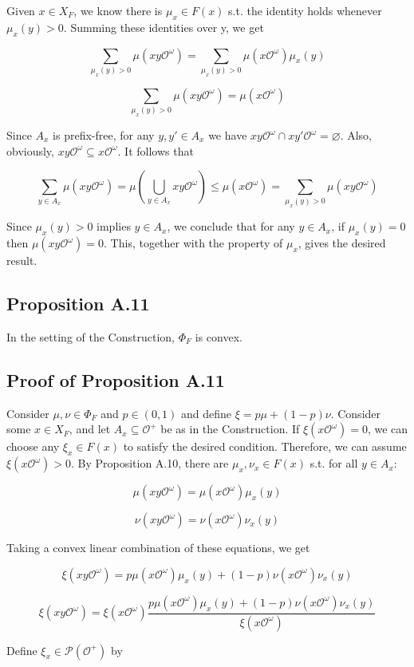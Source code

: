 \documentclass[a4paper]{article}
\newcommand{\Prob}{\mathcal{P}}
\newcommand{\Obs}{\mathcal{O}}
\newcommand{\ObsO}{\Obs^\omega}
\begin{document}
Given ${x \in X_F}$, we know there is ${\mu_x \in F(x)}$ s.t. the identity holds whenever ${\mu_x(y) > 0}$. Summing these identities over y, we get

$$\sum_{\mu_x(y) > 0} \mu(xy\ObsO) = \sum_{\mu_x(y) > 0} \mu(x\ObsO) \mu_x(y)$$

$$\sum_{\mu_x(y) > 0} \mu(xy\ObsO) = \mu(x\ObsO)$$

Since ${A_x}$ is prefix-free, for any ${y,y' \in A_x}$ we have ${xy\ObsO \cap xy'\ObsO = \varnothing}$. Also, obviously, ${xy\ObsO \subseteq x\ObsO}$. It follows that

$$\sum_{y \in A_x} \mu(xy\ObsO) = \mu(\bigcup_{y \in A_x} xy\ObsO) \leq \mu(x\ObsO) = \sum_{\mu_x(y) > 0} \mu(xy\ObsO)$$

Since ${\mu_x(y) > 0}$ implies ${y \in A_x}$, we conclude that for any ${y \in A_x}$, if ${\mu_x(y) = 0}$ then ${\mu(xy\ObsO)=0}$. This, together with the property of ${\mu_x}$, gives the desired result.

\subsection{Proposition A.11}

In the setting of the Construction, ${\Phi_F}$ is convex.

\subsection{Proof of Proposition A.11}

Consider ${\mu,\nu \in \Phi_F}$ and ${p \in (0,1)}$ and define ${\xi = p \mu + (1-p) \nu}$. Consider some ${x \in X_F}$, and let ${A_x \subseteq \Obs^+}$ be as in the Construction. If ${\xi(x\ObsO)=0}$, we can choose any ${\xi_x \in F(x)}$ to satisfy the desired condition. Therefore, we can assume ${\xi(x\ObsO) > 0}$. By Proposition A.10, there are ${\mu_x, \nu_x \in F(x)}$ s.t. for all ${y \in A_x}$:

$$\mu(xy\ObsO) = \mu(x\ObsO) \mu_x(y)$$

$$\nu(xy\ObsO) = \nu(x\ObsO) \nu_x(y)$$

Taking a convex linear combination of these equations, we get

$$\xi(xy\ObsO) = p \mu(x\ObsO) \mu_x(y) + (1-p) \nu(x\ObsO) \nu_x(y)$$

$$\xi(xy\ObsO) = \xi(x\ObsO) \frac{p \mu(x\ObsO) \mu_x(y) + (1-p) \nu(x\ObsO) \nu_x(y)}{\xi(x\ObsO)}$$

Define ${\xi_x \in \Prob(\Obs^+)}$ by 
\end{document}
